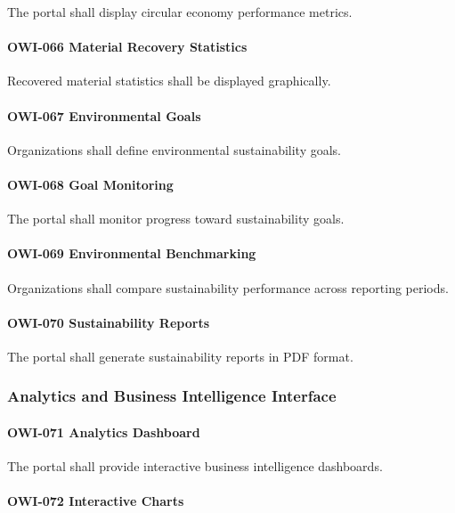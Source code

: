 The portal shall display circular economy performance metrics.

\paragraph{OWI-066 Material Recovery Statistics}

Recovered material statistics shall be displayed graphically.

\paragraph{OWI-067 Environmental Goals}

Organizations shall define environmental sustainability goals.

\paragraph{OWI-068 Goal Monitoring}

The portal shall monitor progress toward sustainability goals.

\paragraph{OWI-069 Environmental Benchmarking}

Organizations shall compare sustainability performance across reporting
periods.

\paragraph{OWI-070 Sustainability Reports}

The portal shall generate sustainability reports in PDF format.


\subsubsection*{Analytics and Business Intelligence Interface}

\paragraph{OWI-071 Analytics Dashboard}

The portal shall provide interactive business intelligence dashboards.

\paragraph{OWI-072 Interactive Charts}

